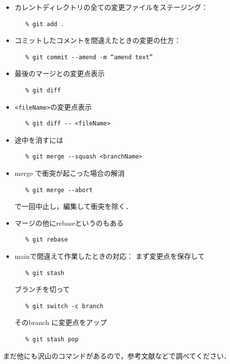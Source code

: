 \begin{itemize}
   \item
       カレントディレクトリの全ての変更ファイルをステージング：
\begin{verbatim}
   % git add .
\end{verbatim}

   \item
      コミットしたコメントを間違えたときの変更の仕方：
\begin{verbatim}
   % git commit --amend -m “amend text”
\end{verbatim}

   \item
      最後のマージとの変更点表示
\begin{verbatim}
   % git diff  
\end{verbatim}
      
   \item
      \verb/<fileName>/の変更点表示
\begin{verbatim}
   % git diff -- <fileName> 
\end{verbatim}

   \item
      途中を消すには
\begin{verbatim}
   % git merge --squash <branchName>
\end{verbatim}

   \item
      merge で衝突が起こった場合の解消
\begin{verbatim}
   % git merge --abort
\end{verbatim}
      で一回中止し，編集して衝突を除く．

   \item
      マージの他にrebaseというのもある 
\begin{verbatim}
   % git rebase
\end{verbatim}

   \item
      mainで間違えて作業したときの対応：
      まず変更点を保存して
\begin{verbatim}
   % git stash
\end{verbatim}
      ブランチを切って
\begin{verbatim}
   % git switch -c branch
\end{verbatim}
      そのbranch に変更点をアップ
 \begin{verbatim}
   % git stash pop
\end{verbatim}
\end{itemize}
まだ他にも沢山のコマンドがあるので，参考文献などで調べてください．


